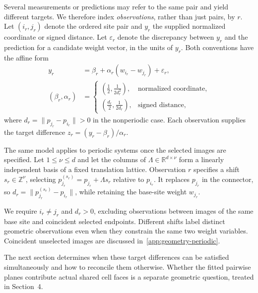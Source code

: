 Several measurements or predictions may refer to the same pair and yield different targets. We therefore index \emph{observations}, rather than just pairs, by $r$. Let $(i_r,j_r)$ denote the ordered site pair and $y_r$ the supplied normalized coordinate or signed distance. Let $\varepsilon_r$ denote the discrepancy between $y_r$ and the prediction for a candidate weight vector, in the units of $y_r$. Both conventions have the affine form
\begin{align}
 y_r&=\beta_r+\alpha_r(w_{i_r}-w_{j_r})+\varepsilon_r,\label{eq:observation-model}\\
 (\beta_r,\alpha_r)&=
 \begin{cases}
 (\frac12,\frac{1}{2d_r^2}), &\text{normalized coordinate},\\[4pt]
 (\frac{d_r}{2},\frac{1}{2d_r}), &\text{signed distance},
 \end{cases}
\end{align}
where $d_r=\|p_{j_r}-p_{i_r}\|>0$ in the nonperiodic case. Each observation supplies the target difference $z_r=(y_r-\beta_r)/\alpha_r$.

The same model applies to periodic systems once the selected images are specified. Let $1\le\nu\le d$ and let the columns of $\Lambda\in\mathbb R^{d\times\nu}$ form a linearly independent basis of a fixed translation lattice. Observation $r$ specifies a shift $s_r\in\mathbb Z^\nu$, selecting $p_{j_r}^{(s_r)}=p_{j_r}+\Lambda s_r$ relative to $p_{i_r}$. It replaces $p_{j_r}$ in the connector, so $d_r=\|p_{j_r}^{(s_r)}-p_{i_r}\|$, while retaining the base-site weight $w_{j_r}$.

We require $i_r\ne j_r$ and $d_r>0$, excluding observations between images of the same base site and coincident selected endpoints. Different shifts label distinct geometric observations even when they constrain the same two weight variables. Coincident unselected images are discussed in~\ref{app:geometry-periodic}.

The next section determines when these target differences can be satisfied simultaneously and how to reconcile them otherwise. Whether the fitted pairwise planes contribute actual shared cell faces is a separate geometric question, treated in Section~4.
